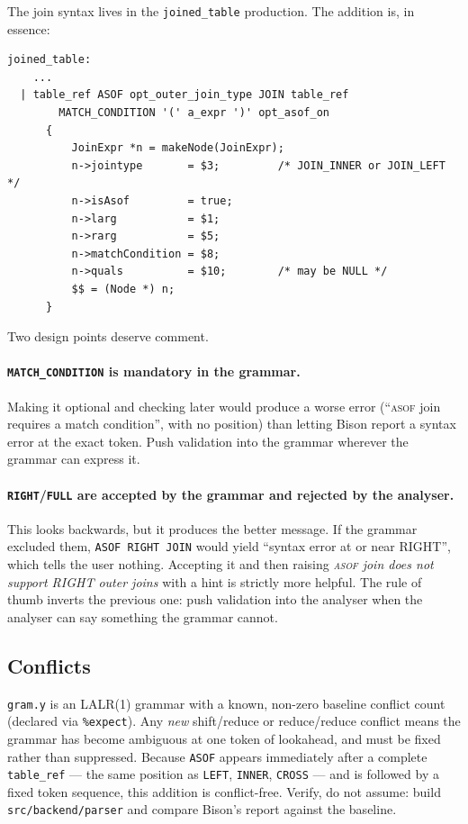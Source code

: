 \documentclass[11pt,a4paper]{report}
\theoremstyle{definition}
\theoremstyle{plain}
\newcommand{\code}[1]{\texttt{\small #1}}
\newcommand{\file}[1]{\texttt{\footnotesize #1}}
\newcommand{\asof}{{\normalfont\scshape asof}}
\begin{document}
The join syntax lives in the \code{joined\_table} production. The addition is, in essence:

\begin{lstlisting}[style=plain]
joined_table:
    ...
  | table_ref ASOF opt_outer_join_type JOIN table_ref
        MATCH_CONDITION '(' a_expr ')' opt_asof_on
      {
          JoinExpr *n = makeNode(JoinExpr);
          n->jointype       = $3;         /* JOIN_INNER or JOIN_LEFT */
          n->isAsof         = true;
          n->larg           = $1;
          n->rarg           = $5;
          n->matchCondition = $8;
          n->quals          = $10;        /* may be NULL */
          $$ = (Node *) n;
      }
\end{lstlisting}

Two design points deserve comment.

\paragraph{\code{MATCH\_CONDITION} is mandatory in the grammar.} Making it optional and
checking later would produce a worse error (``\asof{} join requires a match condition'',
with no position) than letting Bison report a syntax error at the exact token. Push
validation into the grammar wherever the grammar can express it.

\paragraph{\code{RIGHT}/\code{FULL} are accepted by the grammar and rejected by the
analyser.} This looks backwards, but it produces the better message. If the grammar
excluded them, \code{ASOF RIGHT JOIN} would yield ``syntax error at or near RIGHT'', which
tells the user nothing. Accepting it and then raising \emph{\asof{} join does not support
RIGHT outer joins} with a hint is strictly more helpful. The rule of thumb inverts the
previous one: push validation into the analyser when the analyser can say something the
grammar cannot.

\subsection{Conflicts}

\file{gram.y} is an LALR(1) grammar with a known, non-zero baseline conflict count
(declared via \code{\%expect}). Any \emph{new} shift/reduce or reduce/reduce conflict means
the grammar has become ambiguous at one token of lookahead, and must be fixed rather than
suppressed. Because \code{ASOF} appears immediately after a complete \code{table\_ref} ---
the same position as \code{LEFT}, \code{INNER}, \code{CROSS} --- and is followed by a fixed
token sequence, this addition is conflict-free. Verify, do not assume: build
\file{src/backend/parser} and compare Bison's report against the baseline.
\end{document}
